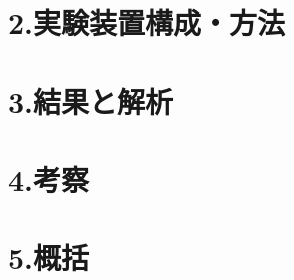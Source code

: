 \documentclass[a4paper,12pt]{jlreq}
\begin{document}
\section*{2.実験装置構成・方法}


\section*{3.結果と解析}


\section*{4.考察}


\section*{5.概括}
\end{document}
